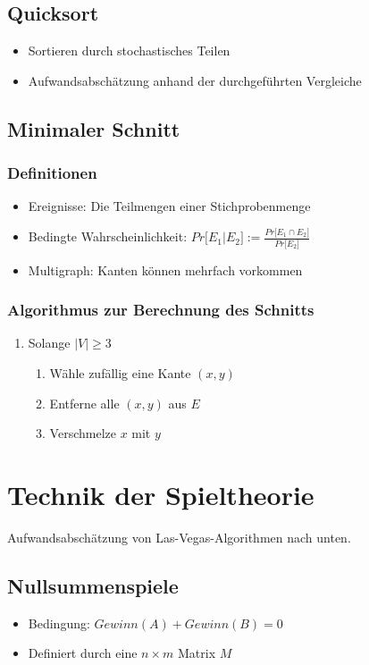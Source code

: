 \subsection{Quicksort}
\begin{itemize}
	\item Sortieren durch stochastisches Teilen
	\item Aufwandsabschätzung anhand der durchgeführten Vergleiche
\end{itemize}


\subsection{Minimaler Schnitt}

\subsubsection{Definitionen}
\begin{itemize}
	\item Ereignisse: Die Teilmengen einer Stichprobenmenge
	\item Bedingte Wahrscheinlichkeit: \(Pr \lbrack E_1 | E_2 \rbrack := \frac{Pr\lbrack E_1 \cap E_2 \rbrack}{Pr\lbrack E_2 \rbrack} \)
	\item Multigraph: Kanten können mehrfach vorkommen
\end{itemize}

\subsubsection{Algorithmus zur Berechnung des Schnitts}
\begin{enumerate}
	\item Solange \(|V| \geq 3\)
	\begin{enumerate}
		\item Wähle zufällig eine Kante \((x,y)\)
		\item Entferne alle \((x,y)\) aus \(E\)
		\item Verschmelze \(x\) mit \(y\)
	\end{enumerate}
\end{enumerate}



\section{Technik der Spieltheorie}
Aufwandsabschätzung von Las-Vegas-Algorithmen nach unten.

\subsection{Nullsummenspiele}
\begin{itemize}
	\item Bedingung: \(Gewinn(A) + Gewinn(B) = 0\)
	\item Definiert durch eine \(n \times m\) Matrix \(M\)
\end{itemize}

